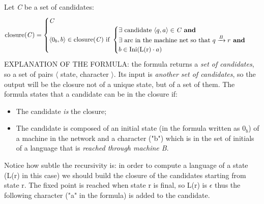 				Let \emph{C} be a set of candidates:
				\begin{equation}
					\text{closure(\emph{C})} =
					\begin{cases}
				  		\text{\emph{C}} \\
				  		\langle 0_b, b \rangle \in \text{closure(\emph{C}) if }
				  		\begin{cases}
				  			\exists \text{ candidate } \langle q, a\rangle \in \text{\emph{C} \textbf{and}}\\
				  			\exists \text{ arc in the machine net so that } q \xrightarrow{B} r \text{\textbf{ and}}\\
				  			b \in \text{Ini(L(r)} \cdot a \text{)}
				  		\end{cases} 
					\end{cases}
			  	\end{equation}
			  	EXPLANATION OF THE FORMULA: the formula returns a \emph{set of candidates}, so a set of pairs $\langle$ state, character $\rangle$. Its input is 
				\emph{another set of candidates}, so the output will be the closure not of a unique state, but of a set of them. The formula states that a candidate 
				can be in the closure if:
			  	\begin{itemize}
			  		\item The candidate \emph{is} the closure;
			  		\item The candidate is composed of an initial state (in the formula written as $0_b$) of a machine in the network and a character ("b") which is 
					in the set of initials of a language that is \emph{reached through machine B}.
			  	\end{itemize}
			  	Notice how subtle the recursivity is: in order to compute a language of a state (L(r) in this case) we should build the closure of the candidates 
				starting from state r. The fixed point is reached when state r is final, so L(r) is $\epsilon$ thus the following character ("a" in the formula) is 
				added to the candidate.
			
